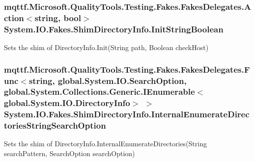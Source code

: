 \hypertarget{class_system_1_1_i_o_1_1_fakes_1_1_shim_directory_info_acbb18a0aec800e36752910aaff9de405}{
\subsubsection[{Init\-String\-Boolean}]{\setlength{\rightskip}{0pt plus 5cm}mqttf.\-Microsoft.\-Quality\-Tools.\-Testing.\-Fakes.\-Fakes\-Delegates.\-Action$<$string, bool$>$ System.\-I\-O.\-Fakes.\-Shim\-Directory\-Info.\-Init\-String\-Boolean\hspace{0.3cm}{\ttfamily [set]}}}\label{class_system_1_1_i_o_1_1_fakes_1_1_shim_directory_info_acbb18a0aec800e36752910aaff9de405}


Sets the shim of Directory\-Info.\-Init(\-String path, Boolean check\-Host)

\hypertarget{class_system_1_1_i_o_1_1_fakes_1_1_shim_directory_info_afc02fae419bc0c6c48143b0b5e027783}{
\subsubsection[{Internal\-Enumerate\-Directories\-String\-Search\-Option}]{\setlength{\rightskip}{0pt plus 5cm}mqttf.\-Microsoft.\-Quality\-Tools.\-Testing.\-Fakes.\-Fakes\-Delegates.\-Func$<$string, global.\-System.\-I\-O.\-Search\-Option, global.\-System.\-Collections.\-Generic.\-I\-Enumerable$<$global.\-System.\-I\-O.\-Directory\-Info$>$ $>$ System.\-I\-O.\-Fakes.\-Shim\-Directory\-Info.\-Internal\-Enumerate\-Directories\-String\-Search\-Option\hspace{0.3cm}{\ttfamily [set]}}}\label{class_system_1_1_i_o_1_1_fakes_1_1_shim_directory_info_afc02fae419bc0c6c48143b0b5e027783}


Sets the shim of Directory\-Info.\-Internal\-Enumerate\-Directories(\-String search\-Pattern, Search\-Option search\-Option)

